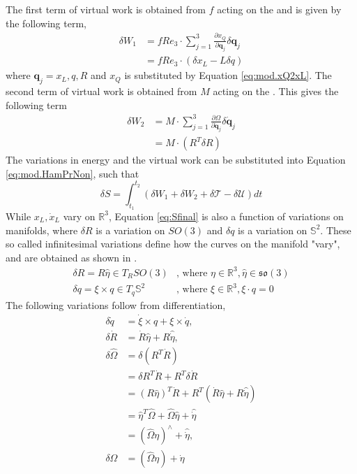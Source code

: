 The first term of virtual work is obtained from $ f $ acting on the  and is given by the following term,
\begin{equation}\label{key}
\begin{aligned}
\delta W_1&=fRe_3\cdot \sum_{j=1}^{3}\frac{\partial x_Q}{\partial \mathbf{q}_j}\delta \mathbf{q}_j\\
&=fRe_3\cdot(\delta x_L-L\delta q)
\end{aligned}
\end{equation}
where $ \mathbf{q}_j={x_L,q,R} $ and $ x_Q $ is substituted by Equation \ref{eq:mod.xQ2xL}.
The second term of virtual work is obtained from $ M $ acting on the . This gives the following term
\begin{equation}\label{key}
\begin{aligned}
\delta W_2&=M\cdot \sum_{j=1}^{3}\frac{\partial\Omega}{\partial \mathbf{\dot{q}}_j}\delta \mathbf{\dot{q}}_j\\
&=M\cdot(R^T\delta R)
\end{aligned}\end{equation}
The variations in energy and the virtual work can be substituted into Equation \ref{eq:mod.HamPrNon}, such that
\begin{equation}\label{eq:Sfinal}
\delta S = \int_{t_1}^{t_2}(\delta W_1+\delta W_2+\delta\mathcal{T}-\delta\mathcal{U})dt
\end{equation}
While $ x_L,\dot{x}_L $ vary on $ \mathbb{R}^3 $, Equation \ref{eq:Sfinal} is also a function of variations on manifolds, where $ \delta R $ is a variation on $ SO(3) $ and $ \delta q $ is a variation on $ \mathbb{S}^2 $. These so called infinitesimal variations define how the curves on the manifold "vary", and are obtained as shown in  \cite{Sreenath2013c,Lee2007,Lee2005,Lee2011,Bullo2005}. 
\begin{equation}\label{eq:mod.varRq}
\begin{aligned}
\delta R=R\hat{\eta}\in T_RSO(3)&\text{, where } \eta\in\mathbb{R}^3,\hat{\eta}\in\mathfrak{so}(3)\\
\delta q=\xi\times q \in T_q\mathbb{S}^2&\text{, where }\xi\in\mathbb{R}^3,\xi\cdot q=0
\end{aligned}
\end{equation}
The following variations follow from differentiation,
\begin{equation}\label{eq:mod.var}
\begin{aligned}
\delta \dot{q}&=\dot{\xi}\times q+\xi\times\dot{q},\\
\delta \dot{R}&=\dot{R}\hat{\eta}+R\hat{\dot{\eta}},\\
\delta \hat{\Omega}&=\delta(R^T\dot{R})\\
&=\delta R^T\dot{R}+R^T\delta\dot{R}\\
&=(R\hat{\eta})^T\dot{R}+R^T (\dot{R}\hat{\eta}+R\hat{\dot{\eta}})\\
&=\hat{\eta}^T\hat{\Omega}+\hat{\Omega}\hat{\eta}+\hat{\dot{\eta}}\\
&=({\hat{\Omega}\eta})^\wedge+\hat{\dot{\eta}},\\
\delta\Omega&=({\hat{\Omega}\eta})+{\dot{\eta}}
\end{aligned}
\end{equation}

